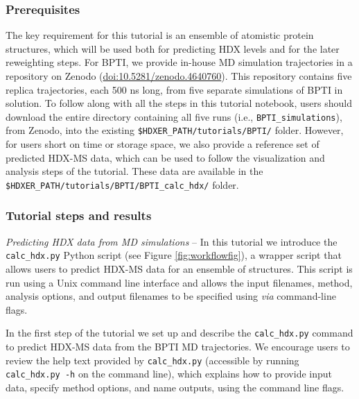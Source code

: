 \documentclass[9pt,tutorial]{livecoms}
\begin{document}
\subsubsection{Prerequisites}
The key requirement for this tutorial is an ensemble of atomistic protein structures, which will be used both for predicting HDX levels and for the later reweighting steps. 
For BPTI, we provide in-house MD simulation trajectories in a repository on Zenodo (\url{doi:10.5281/zenodo.4640760}). 
This repository contains five replica trajectories, each 500 ns long, from five separate simulations of BPTI in solution.
To follow along with all the steps in this tutorial notebook, users should download the entire directory containing all five runs (i.e., \texttt{BPTI\_simulations}), from Zenodo, into the existing \texttt{\$HDXER\_PATH/tutorials/BPTI/} folder.
However, for users short on time or storage space, we also provide a reference set of predicted HDX-MS data, which can be used to follow the visualization and analysis steps of the tutorial. 
These data are available in the \texttt{\$HDXER\_PATH/tutorials/BPTI/BPTI\_calc\_hdx/} folder.

\subsubsection{Tutorial steps and results}\label{calc_hdx_py_sect}

\noindent
\textit{Predicting HDX data from MD simulations} -- In this tutorial we introduce the \texttt{calc\_hdx.py} Python script (see Figure \ref{fig:workflowfig}), a wrapper script that allows users to predict HDX-MS data for an ensemble of structures. 
This script is run using a Unix command line interface and allows the input filenames, method, analysis options, and output filenames to be specified using \textit{via} command-line flags.

In the first step of the tutorial we set up and describe the \texttt{calc\_hdx.py} command to predict HDX-MS data from the BPTI MD trajectories.
We encourage users to review the help text provided by \texttt{calc\_hdx.py} (accessible by running \texttt{calc\_hdx.py -h} on the command line), which explains how to provide input data, specify method options, and name outputs, using the command line flags.
\end{document}
